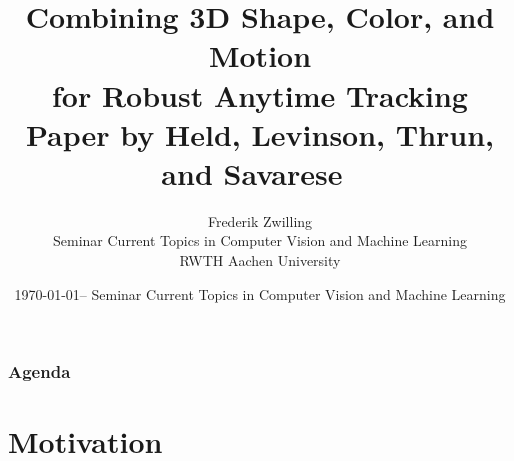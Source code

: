 

\newcommand{\backupbegin}{
   \newcounter{finalframe}
   \setcounter{finalframe}{\value{framenumber}}
}
\newcommand{\backupend}{
   \setcounter{framenumber}{\value{finalframe}}
}

\newcommand*\colvec[3][]{
    \begin{pmatrix}\ifx\relax#1\relax\else#1\\\fi#2\\#3\end{pmatrix}
}
\newcommand{\mattwo}[4]{\begin{pmatrix} #1 & #2 \\ #3 & #4\end{pmatrix}}


\title[Combining 3D Shape, Color, and Motion for Robust Anytime Tracking]{Combining 3D Shape, Color, and Motion\\ for Robust Anytime Tracking\\ \small{Paper by Held, Levinson, Thrun, and Savarese~\cite{paper}}}
\author[Zwilling]{%
  Frederik Zwilling\\
  \bigskip
  {\scriptsize Seminar Current Topics in Computer Vision and Machine Learning\\ RWTH Aachen University}
}

\date[\today @ Seminar CVML]{\today -- Seminar Current Topics in Computer Vision and Machine Learning}



\frame[plain]{\titlepage}
\addtocounter{framenumber}{-1}

\begin{frame}
  \frametitle{Agenda}
  \tableofcontents[hideallsubsections]
\end{frame}

\section{Motivation}

